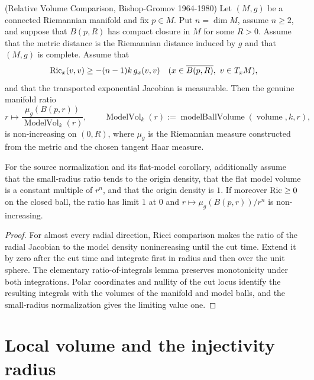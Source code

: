 \begin{theorem}
\label{thm:bishop-gromov}

\label{BishopGromov}


(Relative Volume Comparison, Bishop-Gromov 1964-1980) Let $(M,g)$ be a
connected Riemannian manifold and fix $p\in M$. Put $n=\dim M$, assume
$n\ge2$, and suppose that $B(p,R)$ has compact closure in $M$ for some
$R>0$. Assume that the metric distance is the Riemannian distance induced
by $g$ and that $(M,g)$ is complete. Assume that
\[
\operatorname{Ric}_x(v,v)\ge -(n-1)k\,g_x(v,v)
\quad(x\in\overline{B(p,R)},\ v\in T_xM),
\]
and that the transported exponential Jacobian is measurable. Then the
genuine manifold ratio
\[
r\longmapsto
\frac{\mu_g(B(p,r))}{\operatorname{ModelVol}_k(r)},
\qquad
\operatorname{ModelVol}_k(r):=\operatorname{modelBallVolume}
 (\operatorname{volume},k,r),
\]
is non-increasing on $(0,R)$, where $\mu_g$ is the Riemannian measure
constructed from the metric and the chosen tangent Haar measure.

For the source normalization and its flat-model corollary, additionally
assume that the small-radius ratio tends to the origin density, that the
flat model volume is a constant multiple of $r^n$, and that the origin
density is $1$. If moreover $\operatorname{Ric}\ge0$
on the closed ball, the ratio has limit $1$ at $0$ and
$r\mapsto\mu_g(B(p,r))/r^n$ is non-increasing.

\end{theorem}

\begin{proof}
\sketch
{}
For almost every radial direction, Ricci comparison makes the ratio of the radial Jacobian to the model density nonincreasing until the cut time. Extend it by zero after the cut time and integrate first in radius and then over the unit sphere. The elementary ratio-of-integrals lemma preserves monotonicity under both integrations. Polar coordinates and nullity of the cut locus identify the resulting integrals with the volumes of the manifold and model balls, and the small-radius normalization gives the limiting value one.
\end{proof}

\section{Local volume and the injectivity radius}

